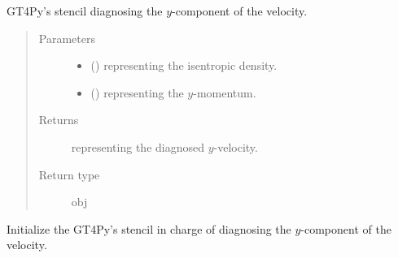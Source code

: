\documentclass[letterpaper,10pt,english]{sphinxmanual}
\begin{document}
\begin{fulllineitems}

\begin{fulllineitems}
\label{\detokenize{api:dycore.diagnostic_isentropic.DiagnosticIsentropic._stencil_diagnosing_velocity_y_defs}}
GT4Py’s stencil diagnosing the \(y\)-component of the velocity.
\begin{quote}\begin{description}
\item[{Parameters}] \leavevmode\begin{itemize}
\item {} 
 () \textendash{}  representing the isentropic density.

\item {} 
 () \textendash{}  representing the \(y\)-momentum.

\end{itemize}

\item[{Returns}] \leavevmode
{} representing the diagnosed \(y\)-velocity.

\item[{Return type}] \leavevmode
obj

\end{description}\end{quote}

\end{fulllineitems}


\begin{fulllineitems}
\label{\detokenize{api:dycore.diagnostic_isentropic.DiagnosticIsentropic._stencil_diagnosing_velocity_y_initialize}}
Initialize the GT4Py’s stencil in charge of diagnosing the \(y\)-component of the velocity.

\end{fulllineitems}



\end{fulllineitems}
\end{document}
